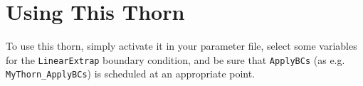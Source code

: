 \documentclass{article}
\begin{document}
\section{Using This Thorn}

To use this thorn, simply activate it in your parameter file, select
some variables for the \texttt{LinearExtrap} boundary condition, and
be sure that \texttt{ApplyBCs} (as e.g. \texttt{MyThorn\_ApplyBCs}) is
scheduled at an appropriate point.


\end{document}
